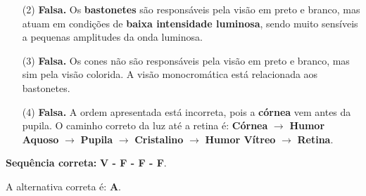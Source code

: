 \begin{flushleft}
\begin{itemize}
    \item[(2)] \textbf{Falsa.} Os \textbf{bastonetes} s\~ao respons\'aveis pela vis\~ao em preto e branco, mas atuam em condi\c{c}\~oes de \textbf{baixa intensidade luminosa}, sendo muito sens\'iveis a pequenas amplitudes da onda luminosa.
    
    \item[(3)] \textbf{Falsa.} Os cones n\~ao s\~ao respons\'aveis pela vis\~ao em preto e branco, mas sim pela vis\~ao colorida. A vis\~ao monocrom\'atica est\'a relacionada aos bastonetes.
    
    \item[(4)] \textbf{Falsa.} A ordem apresentada est\'a incorreta, pois a \textbf{c\'ornea} vem antes da pupila. O caminho correto da luz at\'e a retina \'e: \textbf{C\'ornea} $\rightarrow$ \textbf{Humor Aquoso} $\rightarrow$ \textbf{Pupila} $\rightarrow$ \textbf{Cristalino} $\rightarrow$ \textbf{Humor V\'itreo} $\rightarrow$ \textbf{Retina}.
\end{itemize}

\textbf{Sequ\^encia correta:} \colorbox{green!50}{\textbf{V - F - F - F}}.

A alternativa correta \'e: \colorbox{green!50}{\textbf{A}}.

\end{flushleft}

